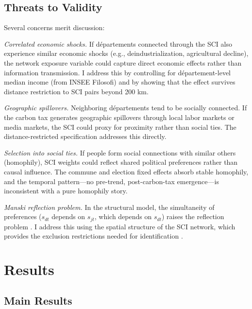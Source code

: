 \documentclass[12pt]{article}
\newcommand{\dept}{d\'{e}partement}
\newcommand{\depts}{d\'{e}partements}
\begin{document}
\subsection{Threats to Validity}

Several concerns merit discussion:

\textit{Correlated economic shocks.} If \depts{} connected through the SCI also experience similar economic shocks (e.g., deindustrialization, agricultural decline), the network exposure variable could capture direct economic effects rather than information transmission. I address this by controlling for \dept{}-level median income (from INSEE Filosofi) and by showing that the effect survives distance restriction to SCI pairs beyond 200 km.

\textit{Geographic spillovers.} Neighboring \depts{} tend to be socially connected. If the carbon tax generates geographic spillovers through local labor markets or media markets, the SCI could proxy for proximity rather than social ties. The distance-restricted specification addresses this directly.

\textit{Selection into social ties.} If people form social connections with similar others (homophily), SCI weights could reflect shared political preferences rather than causal influence. The commune and election fixed effects absorb stable homophily, and the temporal pattern---no pre-trend, post-carbon-tax emergence---is inconsistent with a pure homophily story.

\textit{Manski reflection problem.} In the structural model, the simultaneity of preferences ($s_{dt}$ depends on $s_{jt}$, which depends on $s_{dt}$) raises the reflection problem \citep{manski1993identification}. I address this using the spatial structure of the SCI network, which provides the exclusion restrictions needed for identification \citep{bramouelle2009identification}.



\section{Results}
\label{sec:results}

\subsection{Main Results}
\end{document}
